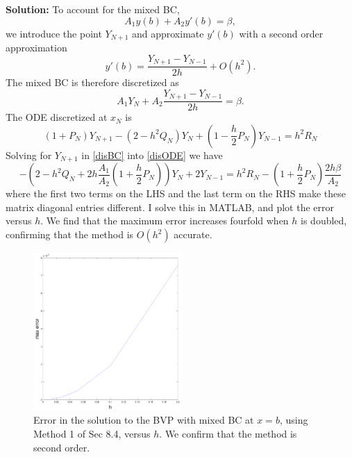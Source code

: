 \documentclass[11pt]{article}
\def\f{\frac }
\newcommand{\oh}[1]{O(h^{{#1}})}
\begin{document}
\begin{enumerate}
\bigskip
\textbf{Solution:} To account for the mixed BC,
\[ A_1 y(b) + A_2 y'(b) = \beta,\]
we introduce the point $Y_{N+1}$ and approximate $y'(b)$ with a second order approximation
\[y'(b) = \f{Y_{N+1}-Y_{N-1} }{2h} + \oh{2} .\]
The mixed BC is therefore discretized as
\begin{equation} A_1 Y_{N} + A_{2} \f{Y_{N+1}-Y_{N-1} }{2h} = \beta. \label{eq:disBC}\end{equation}
The ODE discretized at $x_N$ is
\begin{equation} \left ( 1+P_N \right ) Y_{N+1} - \left ( 2 - h^2 Q_N \right ) Y_N + \left ( 1 - \f{h}{2} P_N \right ) Y_{N-1} = h^2 R_{N} \label{eq:disODE} \end{equation}
Solving for $Y_{N+1}$ in \eqref{disBC} into \eqref{disODE} we have
\begin{equation} - \left ( 2 - h^2 Q_N + 2h \f{A_1}{A_2} \left ( 1 + \f{h}{2} P_N \right ) \right ) Y_N + 2 Y_{N-1} = h^2 R_{N}- \left ( 1+ \f{h}{2}P_N\right ) \f{2h\beta}{A_2}  \label{eq:disODEnew} \end{equation}
where the first two terms on the LHS and the last term on the RHS make these matrix diagonal entries different.
I solve this in MATLAB, and plot the error versus $h$.
We find that the maximum error increases fourfold when $h$ is doubled, confirming that the method is $\oh{2}$ accurate.



\begin{figure}[h!]
  \centering
    \includegraphics[width=0.5\textwidth]{andy_hw08_prb06_01.pdf}
  \caption{Error in the solution to the BVP with mixed BC at $x = b$, using Method 1 of Sec 8.4, versus $h$.
           We confirm that the method is second order.}
\end{figure}


\end{enumerate}
\end{document}
